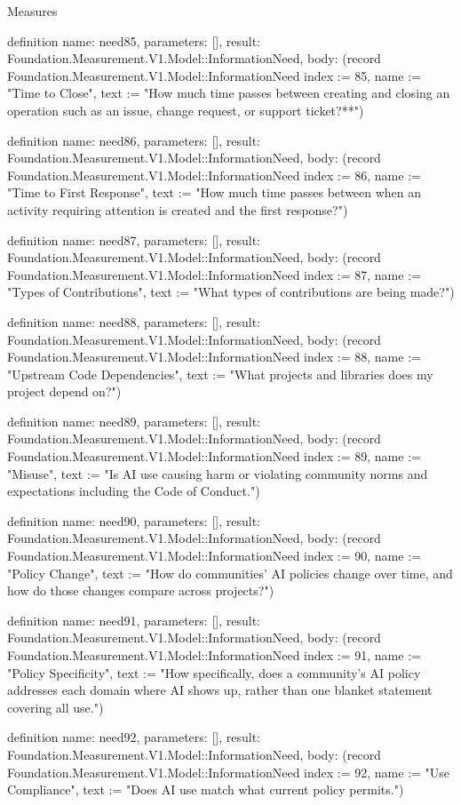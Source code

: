 \begin{lexlean}{Measures}
\begin{semanticmodule}
definition{
  name: need85,
  parameters: [],
  result: Foundation.Measurement.V1.Model::InformationNeed,
  body: (record Foundation.Measurement.V1.Model::InformationNeed {index := 85, name := "Time to Close", text := "How much time passes between creating and closing an operation such as an issue, change request, or support ticket?**"})
}

definition{
  name: need86,
  parameters: [],
  result: Foundation.Measurement.V1.Model::InformationNeed,
  body: (record Foundation.Measurement.V1.Model::InformationNeed {index := 86, name := "Time to First Response", text := "How much time passes between when an activity requiring attention is created and the first response?"})
}

definition{
  name: need87,
  parameters: [],
  result: Foundation.Measurement.V1.Model::InformationNeed,
  body: (record Foundation.Measurement.V1.Model::InformationNeed {index := 87, name := "Types of Contributions", text := "What types of contributions are being made?"})
}

definition{
  name: need88,
  parameters: [],
  result: Foundation.Measurement.V1.Model::InformationNeed,
  body: (record Foundation.Measurement.V1.Model::InformationNeed {index := 88, name := "Upstream Code Dependencies", text := "What projects and libraries does my project depend on?"})
}

definition{
  name: need89,
  parameters: [],
  result: Foundation.Measurement.V1.Model::InformationNeed,
  body: (record Foundation.Measurement.V1.Model::InformationNeed {index := 89, name := "Misuse", text := "Is AI use causing harm or violating community norms and expectations including the Code of Conduct."})
}

definition{
  name: need90,
  parameters: [],
  result: Foundation.Measurement.V1.Model::InformationNeed,
  body: (record Foundation.Measurement.V1.Model::InformationNeed {index := 90, name := "Policy Change", text := "How do communities' AI policies change over time, and how do those changes compare across projects?"})
}

definition{
  name: need91,
  parameters: [],
  result: Foundation.Measurement.V1.Model::InformationNeed,
  body: (record Foundation.Measurement.V1.Model::InformationNeed {index := 91, name := "Policy Specificity", text := "How specifically, does a community's AI policy addresses each domain where AI shows up, rather than one blanket statement covering all use."})
}

definition{
  name: need92,
  parameters: [],
  result: Foundation.Measurement.V1.Model::InformationNeed,
  body: (record Foundation.Measurement.V1.Model::InformationNeed {index := 92, name := "Use Compliance", text := "Does AI use match what current policy permits."})
}


\end{semanticmodule}
\end{lexlean}
